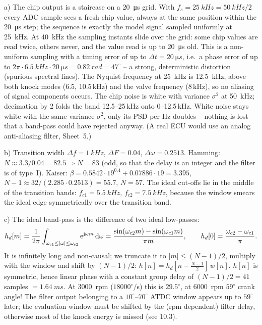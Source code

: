 \begin{solution}
a) The chip output is a staircase on a \SI{20}{\micro s} grid. With
$f_s=\SI{25}{kHz}=\SI{50}{kHz}/2$ every ADC sample sees a fresh chip value,
always at the same position within the \SI{20}{\micro s} step; the sequence is
exactly the model signal sampled uniformly at \SI{25}{kHz}. At \SI{40}{kHz}
the sampling instants slide over the grid: some chip values are read twice,
others never, and the value read is up to \SI{20}{\micro s} old. This is a
non-uniform sampling with a timing error of up to $\Delta t=\SI{20}{\micro s}$,
i.e.\ a phase error of up to $2\pi\cdot\SI{6.5}{kHz}\cdot\SI{20}{\micro s}
=\SI{0.82}{rad}=47^\circ$ -- a strong, deterministic distortion (spurious
spectral lines). The Nyquist frequency at \SI{25}{kHz} is \SI{12.5}{kHz}, above
both knock modes (6.5, 10.5\,kHz) and the valve frequency (8\,kHz), so no
aliasing of signal components occurs. The chip noise is white with variance
$\sigma^2$ at \SI{50}{kHz}; decimation by 2 folds the band 12.5--25\,kHz onto
0--12.5\,kHz. White noise stays white with the same variance $\sigma^2$, only its
PSD per Hz doubles -- nothing is lost that a band-pass could have rejected
anyway. (A real ECU would use an analog anti-aliasing filter, Sheet~5.)

b) Transition width $\Delta f=\SI{1}{kHz}$, $\Delta F=0.04$, $\Delta\omega=0.2513$.
Hamming: $N\approx3.3/0.04=82.5\Rightarrow N=83$ (odd, so that the delay is
an integer and the filter is of type~I). Kaiser: $\beta=0.5842\cdot19^{0.4}
+0.07886\cdot19=3.395$, $N-1\approx 32/(2.285\cdot0.2513)=55.7$, $N=57$.
The ideal cut-offs lie in the middle of the transition bands:
$f_{c1}=\SI{5.5}{kHz}$, $f_{c2}=\SI{7.5}{kHz}$, because the window smears the
ideal edge symmetrically over the transition band.

c) The ideal band-pass is the difference of two ideal low-passes:
\[
  h_d[m]=\frac{1}{2\pi}\int_{\omega_{c1}\le|\omega|\le\omega_{c2}}\mathrm{e}^{\mathrm{j}\omega m}\,\mathrm{d}\omega
        =\frac{\sin(\omega_{c2}m)-\sin(\omega_{c1}m)}{\pi m},\qquad
  h_d[0]=\frac{\omega_{c2}-\omega_{c1}}{\pi}.
\]
It is infinitely long and non-causal; we truncate it to $|m|\le (N-1)/2$, multiply
with the window and shift by $(N-1)/2$: $h[n]=h_d[n-\tfrac{N-1}{2}]\,w[n]$.
$h[n]$ is symmetric, hence linear phase with a constant group delay of
$(N-1)/2=41$ samples $=\SI{1.64}{ms}$. At \SI{3000}{rpm} ($18000^\circ/$s) this
is $29.5^\circ$, at \SI{6000}{rpm} $59^\circ$ crank angle! The filter output
belonging to a $10^\circ$--$70^\circ$ ATDC window appears up to $59^\circ$ later;
the evaluation window must be shifted by the (rpm dependent) filter delay,
otherwise most of the knock energy is missed (see 10.3).


\end{solution}
